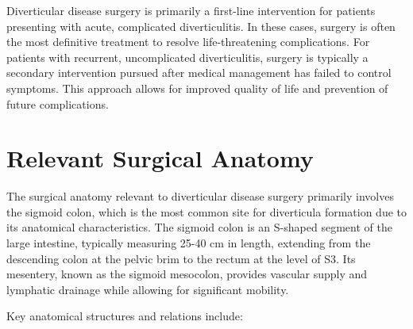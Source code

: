 Diverticular disease surgery is primarily a first-line intervention for patients presenting with acute, complicated diverticulitis. In these cases, surgery is often the most definitive treatment to resolve life-threatening complications. For patients with recurrent, uncomplicated diverticulitis, surgery is typically a secondary intervention pursued after medical management has failed to control symptoms. This approach allows for improved quality of life and prevention of future complications.

\section*{Relevant Surgical Anatomy}
The surgical anatomy relevant to diverticular disease surgery primarily involves the sigmoid colon, which is the most common site for diverticula formation due to its anatomical characteristics. The sigmoid colon is an S-shaped segment of the large intestine, typically measuring 25-40 cm in length, extending from the descending colon at the pelvic brim to the rectum at the level of S3. Its mesentery, known as the sigmoid mesocolon, provides vascular supply and lymphatic drainage while allowing for significant mobility.

Key anatomical structures and relations include:

